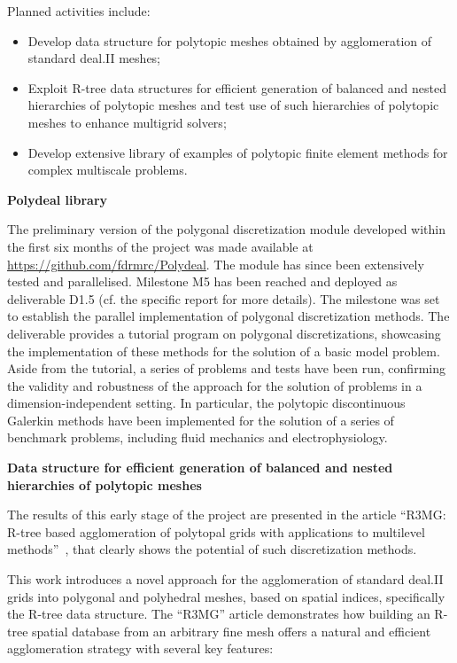 \documentclass[a4paper,12pt, numbers]{article}
\begin{document}
Planned activities include:
\begin{itemize}
\item Develop data structure for polytopic meshes obtained by agglomeration of standard deal.II meshes;
\item Exploit  R-tree data structures for efficient generation of balanced and nested hierarchies of  polytopic meshes and test use of such hierarchies of  polytopic meshes to enhance multigrid solvers;
\item Develop extensive library of examples of polytopic finite element methods for complex multiscale problems.  
\end{itemize}


\noindent\textbf{Polydeal library}

The preliminary version of the polygonal discretization module developed within the first six months of the project was made available at \url{https://github.com/fdrmrc/Polydeal}.
The module has since been extensively tested and parallelised. 
Milestone M5 has been reached and deployed as deliverable D1.5 (cf. the specific report for more details). The milestone was set to establish the parallel implementation of polygonal discretization methods. The deliverable provides a tutorial program on polygonal discretizations, showcasing the implementation of these methods for the solution of a basic model problem. Aside from the tutorial, a series of problems and tests have been run, confirming the validity and robustness of the approach for the solution of problems in a dimension-independent setting. In particular, the polytopic discontinuous Galerkin methods have been implemented for the solution of a series of benchmark problems, including fluid mechanics and electrophysiology.

\noindent\textbf{Data structure for efficient generation of balanced and nested hierarchies of  polytopic meshes}

The results of this early stage of the project are presented in the article ``R3MG:
R-tree based agglomeration of polytopal grids with applications to multilevel
methods''~\cite{FederEtAl2025}, that clearly shows the potential of such
discretization methods. 

This work introduces a novel approach for the agglomeration of standard deal.II
grids into polygonal and polyhedral meshes, based on spatial indices,
specifically the R-tree data structure. The ``R3MG'' article demonstrates how
building an R-tree spatial database from an arbitrary fine mesh offers a natural
and efficient agglomeration strategy with several key features: 
\end{document}
